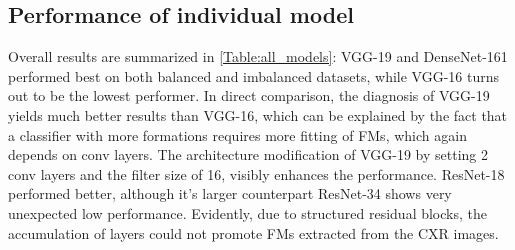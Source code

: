 \documentclass[conference]{IEEEtran}
\begin{document}

\subsection{Performance of individual model}
Overall results are summarized in \cref{Table:all_models}: VGG-19 and DenseNet-161 performed best on both balanced and imbalanced datasets, while VGG-16 turns out to be the lowest performer. In direct comparison, the diagnosis of VGG-19 yields much better results than VGG-16, which can be explained by the fact that a classifier with more formations requires more fitting of FMs, which again depends on conv layers. The architecture modification of VGG-19 by setting 2 conv layers and the filter size of 16, visibly enhances the performance. ResNet-18 performed better, although it's larger counterpart ResNet-34 shows very unexpected low performance. Evidently, due to structured residual blocks, the accumulation of layers could not promote FMs extracted from the CXR images.
\end{document}
